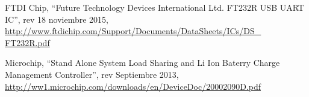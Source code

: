 \begin{thebibliography}{99}
 FTDI Chip, ``Future Technology Devices International Ltd. FT232R USB UART IC'', rev 18 noviembre 2015, \hyperref[temp]{http://www.ftdichip.com/Support/Documents/DataSheets/ICs/DS\_ FT232R.pdf}

 Microchip, ``Stand\- Alone System Load Sharing and Li\- Ion Baterry Charge Management Controller'', rev Septiembre 2013, \hyperref[temp]{http://ww1.microchip.com/downloads/en/DeviceDoc/20002090D.pdf}

%
%
\end{thebibliography}